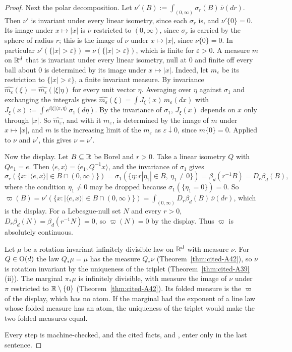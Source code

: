 \begin{proof}
Next the polar decomposition. Let $\nu'(B) := \int_{(0,\infty)}\sigma_r(B)\,\overline\nu(dr)$. Then
$\nu'$ is invariant under every linear isometry, since each $\sigma_r$ is, and $\nu'\{0\} = 0$. Its
image under $x \mapsto |x|$ is $\overline\nu$ restricted to $(0,\infty)$, since $\sigma_r$ is carried
by the sphere of radius $r$; this is the image of $\nu$ under $x \mapsto |x|$, since $\nu\{0\} = 0$. In
particular $\nu'(\{|x| > \varepsilon\}) = \nu(\{|x| > \varepsilon\})$, which is finite for
$\varepsilon > 0$. A measure $m$ on $\mathbb{R}^d$ that is invariant under every linear isometry, null at
$0$ and finite off every ball about $0$ is determined by its image under $x \mapsto |x|$. Indeed, let
$m_\varepsilon$ be its restriction to $\{|x| > \varepsilon\}$, a finite invariant measure. By
invariance $\widehat{m_\varepsilon}(\xi) = \widehat{m_\varepsilon}(|\xi|\eta)$ for every unit vector
$\eta$. Averaging over $\eta$ against $\sigma_1$ and exchanging the integrals gives
$\widehat{m_\varepsilon}(\xi) = \int J_\xi(x)\,m_\varepsilon(dx)$ with
$J_\xi(x) := \int e^{i|\xi|\langle x, \eta\rangle}\,\sigma_1(d\eta)$. By the invariance of
$\sigma_1$, $J_\xi(x)$ depends on $x$ only through $|x|$. So $\widehat{m_\varepsilon}$, and with it
$m_\varepsilon$, is determined by the image of $m$ under $x \mapsto |x|$, and $m$ is the increasing
limit of the $m_\varepsilon$ as $\varepsilon \downarrow 0$, since $m\{0\} = 0$. Applied to $\nu$ and
$\nu'$, this gives $\nu = \nu'$.

Now the display. Let $B \subseteq \mathbb{R}$ be Borel and $r > 0$. Take a linear isometry $Q$ with
$Qe_1 = e$. Then $\langle e, x\rangle = \langle e_1, Q^{-1}x\rangle$, and the invariance of $\sigma_1$
gives
\[
  \sigma_r(\{x : |\langle e, x\rangle| \in B \cap (0,\infty)\})
  = \sigma_1(\{\eta : r|\eta_1| \in B,\ \eta_1 \ne 0\}) = \beta_d(r^{-1}B) = D_r\beta_d(B) ,
\]
where the condition $\eta_1 \ne 0$ may be dropped because $\sigma_1(\{\eta_1 = 0\}) = 0$. So
$\varpi(B) = \nu'(\{x : |\langle e, x\rangle| \in B \cap (0,\infty)\})
= \int_{(0,\infty)}D_r\beta_d(B)\,\overline\nu(dr)$, which is the display. For a Lebesgue-null set
$N$ and every $r > 0$, $D_r\beta_d(N) = \beta_d(r^{-1}N) = 0$, so $\varpi(N) = 0$ by the display.
Thus $\varpi$ is absolutely continuous.

Let $\mu$ be a rotation-invariant infinitely divisible law on $\mathbb{R}^d$ with \Levy{} measure $\nu$. For
$Q \in \mathrm{O}(d)$ the law $Q_*\mu = \mu$ has the \Levy{} measure $Q_*\nu$
(Theorem~\ref{thm:cited-A42}), so $\nu$ is rotation invariant by the
uniqueness of the triplet (Theorem~\ref{thm:cited-A39}(ii)). The marginal $\pi_*\mu$ is
infinitely divisible, with \Levy{} measure the image of $\nu$ under $\pi$ restricted to
$\mathbb{R} \setminus \{0\}$ (Theorem~\ref{thm:cited-A42}). Its folded \Levy{} measure is the
$\varpi$ of the display, which has no atom. If the marginal had the exponent of a line law whose folded
\Levy{} measure has an atom, the uniqueness of the triplet would make the two folded measures equal.

Every step is machine-checked, and the cited facts,  and , enter only in
the last sentence.
\end{proof}

